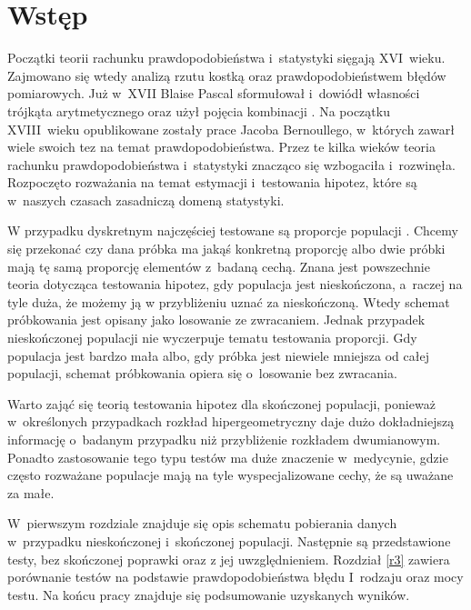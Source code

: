 \chapter*{Wstęp}
Początki teorii rachunku prawdopodobieństwa i~statystyki sięgają XVI~wieku. Zajmowano się wtedy analizą rzutu kostką oraz prawdopodobieństwem błędów pomiarowych. Już w~XVII Blaise Pascal sformułował i~dowiódł własności trójkąta arytmetycznego oraz użył pojęcia kombinacji \cite{Hald2003}. Na początku XVIII~wieku opublikowane zostały prace Jacoba Bernoullego, w~których zawarł wiele swoich tez na temat prawdopodobieństwa. Przez te kilka wieków teoria rachunku prawdopodobieństwa i~statystyki znacząco się wzbogaciła i~rozwinęła. Rozpoczęto rozważania na temat estymacji i~testowania hipotez, które są w~naszych czasach zasadniczą domeną statystyki.

W przypadku dyskretnym najczęściej testowane są proporcje populacji \cite{Lehmann1968}. Chcemy się przekonać czy dana próbka ma jakąś konkretną proporcję albo dwie próbki mają tę samą proporcję elementów z~badaną cechą. Znana jest powszechnie teoria dotycząca testowania hipotez, gdy populacja jest nieskończona, a~raczej na tyle duża, że możemy ją w przybliżeniu uznać za nieskończoną. Wtedy schemat próbkowania \cite{Edgeworth1918} jest opisany jako losowanie ze zwracaniem. Jednak przypadek nieskończonej populacji nie wyczerpuje tematu testowania proporcji. Gdy populacja jest bardzo mała albo, gdy próbka jest niewiele mniejsza od całej populacji, schemat próbkowania opiera się o~losowanie bez zwracania. 

Warto zająć się teorią testowania hipotez dla skończonej populacji, ponieważ w~określonych przypadkach rozkład hipergeometryczny daje dużo dokładniejszą informację o~badanym przypadku niż przybliżenie rozkładem dwumianowym. Ponadto zastosowanie tego typu testów ma duże znaczenie w~medycynie, gdzie często rozważane populacje mają na tyle wyspecjalizowane cechy, że są uważane za małe.

W~pierwszym rozdziale znajduje się opis schematu pobierania danych w~przypadku nieskończonej i~skończonej populacji. Następnie są przedstawione testy, bez skończonej poprawki oraz z jej uwzględnieniem. Rozdział \ref{r3} zawiera porównanie testów na podstawie prawdopodobieństwa błędu I~rodzaju oraz mocy testu. Na końcu pracy znajduje się podsumowanie uzyskanych wyników.